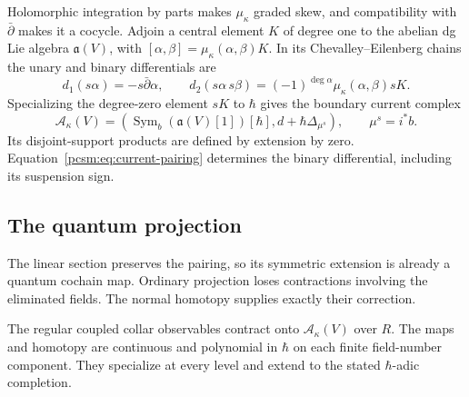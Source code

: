 Holomorphic\label{pcsm:def:current-central-extension} integration by parts makes \(\mu_\kappa\) graded
skew, and compatibility with \(\bar\partial\) makes it a cocycle.
Adjoin a central element \(K\) of degree one to the abelian dg Lie
algebra \(\mathfrak a(V)\), with
\([\alpha,\beta]=\mu_\kappa(\alpha,\beta)K\).
In its Chevalley--Eilenberg chains the unary and binary differentials are
\[
 d_1(s\alpha)=-s\bar\partial\alpha,
 \qquad
 d_2(s\alpha\,s\beta)=(-1)^{\deg\alpha}
                           \mu_\kappa(\alpha,\beta)sK.
\]
Specializing\label{pcsm:def:boundary-current-complex} the degree-zero element \(sK\) to \(\hbar\) gives
the boundary current complex
\[
 \mathcal A_\kappa(V)=
 \left(\operatorname{Sym}_b(\mathfrak a(V)[1])[\hbar],
                  d+\hbar\Delta_{\mu^s}\right),
 \qquad \mu^s=i^*b.
\]
Its disjoint-support products are defined by extension by zero.
Equation~\eqref{pcsm:eq:current-pairing} determines the binary
differential, including its suspension sign.

\subsection{The quantum projection}

The linear section preserves the pairing, so its symmetric extension
is already a quantum cochain map.
Ordinary projection loses contractions involving the eliminated fields.
The normal homotopy supplies exactly their correction.

\begin{proposition}\label{pcsm:quantprojection}
The regular coupled collar observables contract onto
\(\mathcal A_\kappa(V)\) over \(R\).
The maps and homotopy are continuous and polynomial in \(\hbar\)
on each finite field-number component.
They specialize at every level and extend to the stated
\(\hbar\)-adic completion.
\end{proposition}

